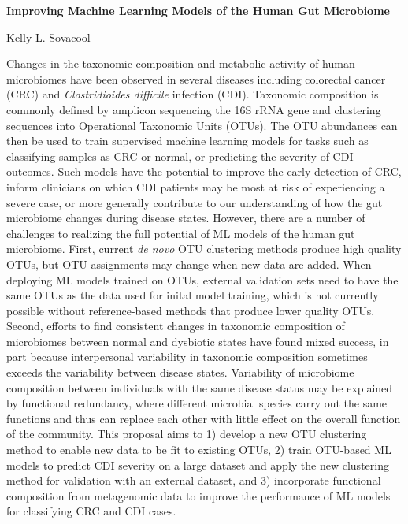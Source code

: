 \documentclass[11pt]{article}
\begin{document}
\sloppy
\begin{center}
\large{\textbf{
    Improving Machine Learning Models of the Human Gut Microbiome
}}

\vspace{11pt}

\small{
    Kelly L. Sovacool
}
\end{center}

Changes in the taxonomic composition and metabolic activity of human microbiomes
have been observed in several diseases including colorectal cancer (CRC) and
\textit{Clostridioides difficile} infection (CDI).
Taxonomic composition is commonly defined by amplicon sequencing the 16S rRNA
gene and clustering sequences into Operational Taxonomic Units (OTUs).
The OTU abundances can then be used to train supervised machine learning models
for tasks such as classifying samples as CRC or normal, or predicting the 
severity of CDI outcomes.
Such models have the potential to improve the early detection of CRC, 
inform clinicians on which CDI patients may be most at risk of experiencing a severe case,
or more generally contribute to our understanding of how the gut microbiome 
changes during disease states.
However, there are a number of challenges to realizing the full 
potential of ML models of the human gut microbiome.
First, current \textit{de novo} OTU clustering methods produce high quality OTUs, 
but OTU assignments may change when new data are added.
When deploying ML models trained on OTUs, external validation sets need to have 
the same OTUs as the data used for inital model training, which is not currently 
possible without reference-based methods that produce lower quality OTUs.
Second, efforts to find consistent changes in taxonomic composition of microbiomes
between normal and dysbiotic states have found mixed success, in part because
interpersonal variability in taxonomic composition sometimes exceeds the
variability between disease states.
Variability of microbiome composition between individuals with the same disease
status may be explained by functional redundancy, where different microbial
species carry out the same functions and thus can replace each other with little
effect on the overall function of the community.
This proposal aims to 
1) develop a new OTU clustering method to enable new data to be fit to existing OTUs, 
2) train OTU-based ML models to predict CDI severity on a large dataset and 
apply the new clustering method for validation with an external dataset, and 
3) incorporate functional composition from metagenomic data to improve the 
performance of ML models for classifying CRC and CDI cases.
\end{document}
